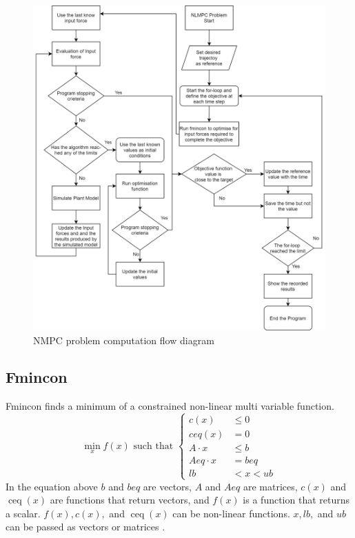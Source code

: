 \documentclass{UoNMCHA}
\numberwithin{equation}{section}
\begin{document}
		\begin{figure}[H]
		\begin{center}
			\includegraphics[width=.8\linewidth]{figs/fmincon}
			\caption{NMPC problem computation flow diagram}
			\label{figs/fmincon}
		\end{center}
	\end{figure}
	
	
	\subsection{Fmincon}
	Fmincon finds a minimum of a constrained non-linear multi variable function.
	\begin{equation}
	\min _{x} f(x) \text { such that }\left\{\begin{aligned}
	c(x) & \leq 0 \\
	{ceq}(x) &=0 \\
	A \cdot x & \leq b \\
	A e q \cdot x &=b e q \\
	l b &<x<u b
	\end{aligned}\right.
	\end{equation}
	In the equation above $b$ and $beq$ are vectors, $A$ and $ Aeq $ are matrices, $c(x)$ and $\operatorname{ceq}(x)$ are functions that return vectors, and $f(x)$
	is a function that returns a scalar. $f(x), c(x),$ and $\operatorname{ceq}(x)$ can be non-linear functions. $x, lb,$ and $ub$ can be
	passed as vectors or matrices \cite{rabaey_optimization}.\\
	
\end{document}
